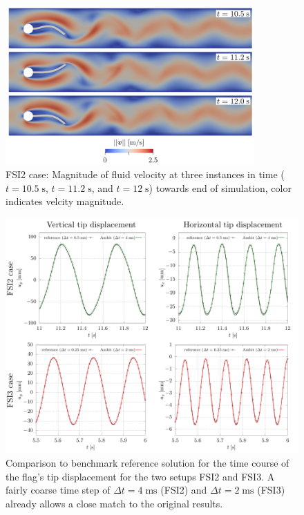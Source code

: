\documentclass[a4paper,12pt]{report}
\begin{document}
\begin{figure}
\centering
\includegraphics[width=0.85\textwidth]{fig/channel_flag_results.png}
\caption{FSI2 case: Magnitude of fluid velocity at three instances in time ($t=10.5\;\mathrm{s}$, $t=11.2\;\mathrm{s}$, and $t=12\;\mathrm{s}$) towards end of simulation, color indicates velcity magnitude.}
\label{fig:channel_flag_results}
\end{figure}


\begin{figure}
\centering
\includegraphics[width=1.0\textwidth]{fig/channel_flag_results_verif.png}
\caption{Comparison to benchmark reference solution for the time course of the flag's tip displacement for the two setups FSI2 and FSI3. A fairly coarse time step of $\Delta t = 4 \;\mathrm{ms}$ (FSI2) and $\Delta t = 2 \;\mathrm{ms}$ (FSI3) already allows a close match to the original results.}
\label{fig:channel_flag_results_verif}
\end{figure}
\end{document}
